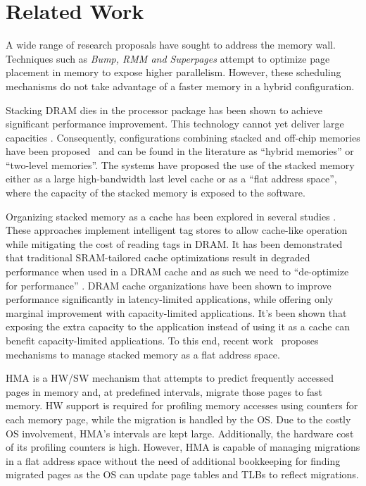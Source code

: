 
\section{Related Work}
\label{sec:Background}

A wide range of research proposals have sought to address the memory wall. Techniques such as \textit{Bump\cite{BUMP}, RMM\cite{RMM} and Superpages\cite{SUPERPAGES}} attempt to optimize page placement in memory to expose higher parallelism. However, these scheduling mechanisms do not take advantage of a faster memory in a hybrid configuration.

Stacking DRAM dies in the processor package has been shown to achieve significant performance improvement. This technology cannot yet deliver large capacities \cite{JEDEC-HBM-REVISED}. Consequently, configurations combining stacked and off-chip memories have been proposed~\cite{LOH-HYBRID,qureshi-micro2012} and can be found in the literature as ``hybrid memories'' or ``two-level memories''. The systems have proposed the use of the stacked memory either as a large high-bandwidth last level cache or as a ``flat address space'', where the capacity of the stacked memory is exposed to the software.

Organizing stacked memory as a cache has been explored in several studies \cite{qureshi-micro2012,BEAR,BIMODAL,citadel,tagless-dram-cache,UNISON}. These approaches implement intelligent tag stores to allow cache-like operation while
 mitigating the cost of reading tags in DRAM. It has been demonstrated that traditional SRAM-tailored cache optimizations result in degraded performance when used in a DRAM cache and as such we need to ``de-optimize for performance'' \cite{qureshi-micro2012}. DRAM cache organizations have been shown to improve performance significantly in latency-limited applications, while offering only marginal improvement with capacity-limited applications. It's been shown that exposing the extra capacity to the application instead of using it as a cache can benefit capacity-limited applications. To this end, recent work~\cite{meswani-HPCA21,sim-micro2014,cameo} proposes mechanisms to manage stacked memory as a flat address space. 

HMA \cite{meswani-HPCA21} is a HW/SW mechanism that attempts to predict frequently accessed pages in memory and, at predefined intervals, migrate those pages to fast memory. HW support is required for profiling memory accesses using counters for each memory page, while the migration is handled by the OS. Due to the costly OS involvement, HMA's intervals are kept large.  Additionally, 
the hardware cost of its profiling counters is high. However, HMA is capable of managing migrations in a flat address space without the need of additional bookkeeping for finding migrated pages as the OS can update page tables and TLBs to reflect migrations.

